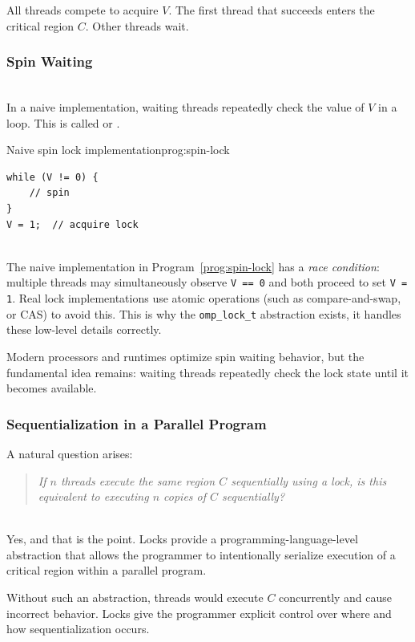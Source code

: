 All threads compete to acquire $V$. The first thread that succeeds enters the critical region $C$. Other threads wait.

\subsubsection{Spin Waiting}

\begin{ppdefn}
\\ In a naive implementation, waiting threads repeatedly check the value of $V$ in a loop. This is called  or .
\end{ppdefn}

\begin{ppprogram}{Naive spin lock implementation}{prog:spin-lock}
\begin{lstlisting}[language=C11]
while (V != 0) {
    // spin
}
V = 1;  // acquire lock
\end{lstlisting}
\end{ppprogram}

\begin{pppitfall}
\\ The naive implementation in Program~\ref{prog:spin-lock} has a \emph{race condition}: multiple threads may simultaneously observe \texttt{V == 0} and both proceed to set \texttt{V = 1}. Real lock implementations use atomic operations (such as compare-and-swap, or CAS) to avoid this. This is why the \texttt{omp\_lock\_t} abstraction exists, it handles these low-level details correctly.
\end{pppitfall}

Modern processors and runtimes optimize spin waiting behavior, but the fundamental idea remains: waiting threads repeatedly check the lock state until it becomes available.

\subsubsection{Sequentialization in a Parallel Program}

A natural question arises:

\begin{quote}
\emph{If $n$ threads execute the same region $C$ sequentially using a lock, is this equivalent to executing $n$ copies of $C$ sequentially?}
\end{quote}

\begin{ppkey}
\\ Yes, and that is the point. Locks provide a programming-language-level abstraction that allows the programmer to intentionally serialize execution of a critical region within a parallel program.

Without such an abstraction, threads would execute $C$ concurrently and cause incorrect behavior. Locks give the programmer explicit control over where and how sequentialization occurs.
\end{ppkey}

